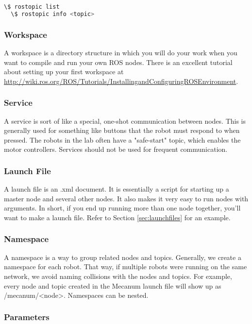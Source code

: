 \begin{lstlisting}[language=bash]
  \$ rostopic list
  \$ rostopic info <topic>
\end{lstlisting}

\subsubsection{Workspace}

A workspace is a directory structure in which you will do your work when you want to compile and run your own ROS nodes. There is an excellent tutorial about setting up your first workspace at \url{http://wiki.ros.org/ROS/Tutorials/InstallingandConfiguringROSEnvironment}. 

\subsubsection{Service}

A service is sort of like a special, one-shot communication between nodes. This is generally used for something like buttons that the robot must respond to when pressed. The robots in the lab often have a "safe-start" topic, which enables the motor controllers. Services should not be used for frequent communication.

\subsubsection{Launch File}

A launch file is an .xml document. It is essentially a script for starting up a master node and several other nodes. It also makes it very easy to run nodes with arguments. In short, if you end up running more than one node together, you'll want to make a launch file. Refer to Section \ref{sec:launchfiles} for an example.

\subsubsection{Namespace}

A namespace is a way to group related nodes and topics. Generally, we create a namespace for each robot. That way, if multiple robots were running on the same network, we avoid naming collisions with the nodes and topics. For example, every node and topic created in the Mecanum launch file will show up as /mecanum/<node>. Namespaces can be nested.

\subsubsection{Parameters}

